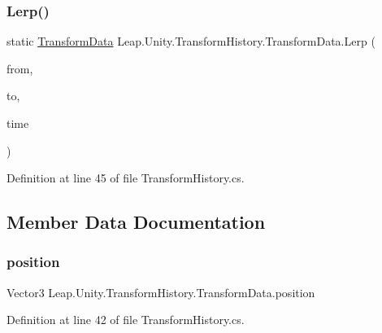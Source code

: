 \subsubsection{\texorpdfstring{Lerp()}{Lerp()}}
{\footnotesize\ttfamily static \mbox{\hyperlink{struct_leap_1_1_unity_1_1_transform_history_1_1_transform_data}{Transform\+Data}} Leap.\+Unity.\+Transform\+History.\+Transform\+Data.\+Lerp (\begin{DoxyParamCaption}\item[{\mbox{\hyperlink{struct_leap_1_1_unity_1_1_transform_history_1_1_transform_data}{Transform\+Data}}}]{from,  }\item[{\mbox{\hyperlink{struct_leap_1_1_unity_1_1_transform_history_1_1_transform_data}{Transform\+Data}}}]{to,  }\item[{long}]{time }\end{DoxyParamCaption})\hspace{0.3cm}{\ttfamily [static]}}



Definition at line 45 of file Transform\+History.\+cs.



\subsection{Member Data Documentation}
\mbox{\label{struct_leap_1_1_unity_1_1_transform_history_1_1_transform_data_a0205942fe8f0a6f48a927affe6717941}} 
\subsubsection{\texorpdfstring{position}{position}}
{\footnotesize\ttfamily Vector3 Leap.\+Unity.\+Transform\+History.\+Transform\+Data.\+position}



Definition at line 42 of file Transform\+History.\+cs.

\mbox{\label{struct_leap_1_1_unity_1_1_transform_history_1_1_transform_data_a0c3da041f6f2c8bd7a4fd72b77b22898}} 
